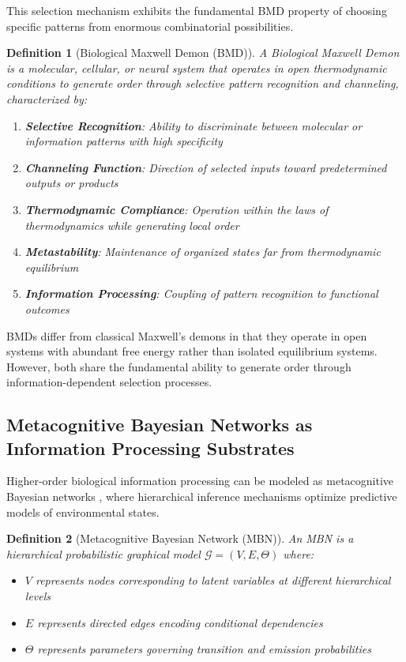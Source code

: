 \documentclass[12pt,a4paper]{article}
\newtheorem{definition}{Definition}[section]
\begin{document}
This selection mechanism exhibits the fundamental BMD property of choosing specific patterns from enormous combinatorial possibilities.

\begin{definition}[Biological Maxwell Demon (BMD)]
A Biological Maxwell Demon is a molecular, cellular, or neural system that operates in open thermodynamic conditions to generate order through selective pattern recognition and channeling, characterized by:
\begin{enumerate}
\item \textbf{Selective Recognition}: Ability to discriminate between molecular or information patterns with high specificity
\item \textbf{Channeling Function}: Direction of selected inputs toward predetermined outputs or products  
\item \textbf{Thermodynamic Compliance}: Operation within the laws of thermodynamics while generating local order
\item \textbf{Metastability}: Maintenance of organized states far from thermodynamic equilibrium
\item \textbf{Information Processing}: Coupling of pattern recognition to functional outcomes
\end{enumerate}
\end{definition}

BMDs differ from classical Maxwell's demons in that they operate in open systems with abundant free energy rather than isolated equilibrium systems. However, both share the fundamental ability to generate order through information-dependent selection processes.

\subsection{Metacognitive Bayesian Networks as Information Processing Substrates}

Higher-order biological information processing can be modeled as metacognitive Bayesian networks \citep{friston2010free, clark2013whatever}, where hierarchical inference mechanisms optimize predictive models of environmental states.

\begin{definition}[Metacognitive Bayesian Network (MBN)]
An MBN is a hierarchical probabilistic graphical model $\mathcal{G} = (V, E, \Theta)$ where:
\begin{itemize}
\item $V$ represents nodes corresponding to latent variables at different hierarchical levels
\item $E$ represents directed edges encoding conditional dependencies
\item $\Theta$ represents parameters governing transition and emission probabilities
\end{itemize}
\end{definition}
\end{document}
